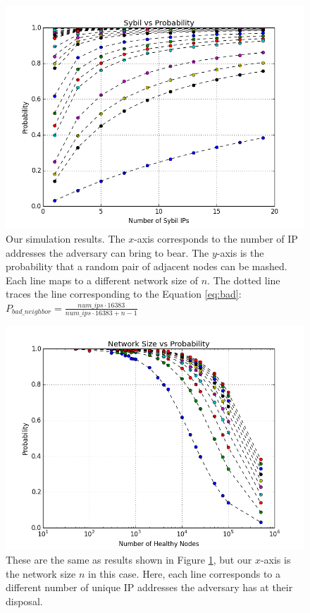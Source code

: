 \documentclass[11pt,conference]{IEEEtran}
\begin{document}
\begin{figure}
\centering
\includegraphics[width=1\linewidth]{ip_prob_all}
\caption[foo]{Our simulation results.  
    The $x$-axis corresponds to the number of IP addresses the adversary can bring to bear.
    The $y$-axis is the probability that a random pair of adjacent nodes can be mashed.
    Each line maps to a different network size of $n$.
    The dotted line traces the line corresponding to the Equation \ref{eq:bad}: $ P_{bad\_neighbor} =  \frac{num\_ips \cdot 16383}{num\_ips \cdot 16383 + n - 1}$}
\label{fig:exp2}
\end{figure}


\begin{figure}
\centering
\includegraphics[width=\linewidth]{size_prob_all}
\caption[a]{These are the same as results shown in Figure \ref{fig:exp2}, but our $x$-axis is the network size $n$ in this case.  
    Here, each line corresponds to a different number of unique IP addresses the adversary has at their disposal.}
\label{fig:size_prob_all}
\end{figure}
\end{document}
